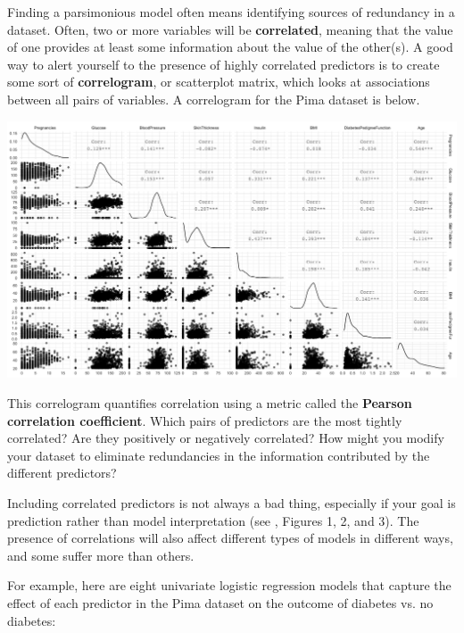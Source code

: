 Finding a parsimonious model often means identifying sources of redundancy in a dataset. Often, two or more variables will be \textbf{correlated}, meaning that the value of one provides at least some information about the value of the other(s). A good way to alert yourself to the presence of highly correlated predictors is to create some sort of \textbf{correlogram}, or scatterplot matrix, which looks at associations between all pairs of variables. A correlogram for the Pima dataset is below.

\begin{center}
\includegraphics[width=\textwidth]{img/pima-ggpairs.png}
\end{center}

\begin{question}{}
This correlogram quantifies correlation using a metric called the \textbf{Pearson correlation coefficient}. Which pairs of predictors are the most tightly correlated? Are they positively or negatively correlated? How might you modify your dataset to eliminate redundancies in the information contributed by the different predictors?
\end{question}

Including correlated predictors is not always a bad thing, especially if your goal is prediction rather than model interpretation (see \cite{guyon2003introduction}, Figures 1, 2, and 3). The presence of correlations will also affect different types of models in different ways, and some suffer more than others. 

For example, here are eight univariate logistic regression models that capture the effect of each predictor in the Pima dataset on the outcome of diabetes vs. no diabetes:

